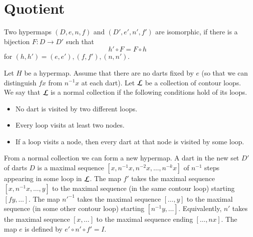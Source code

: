 %
%
%
%




\section{Quotient}


\begin{definition}[isomorphic] Two hypermaps $(D,e,n,f)$ and $(D',e',n',f')$ are
isomorphic, if there is a bijection $F:D\to D'$ such that
    $$h'\circ F = F\circ h$$
for $(h,h')=(e,e'), (f,f'), (n,n')$.
\end{definition}


\begin{definition}
Let $H$ be a hypermap. Assume that 
there are no darts fixed by $e$ 
(so that we can distinguish $f x$
from $n^{-1} x$ at each dart). 
Let $\cal L$ be a collection of contour
loops.  We say that $\cal L$ is a normal collection if the following
conditions hold of its loops. \begin{itemize}
 \item No dart is visited by two different loops.
 \item Every loop visits at least two nodes.
 \item If a loop visits a node, then every dart at that node is
 visited by some loop.
\end{itemize}
\end{definition}

From a normal collection we can form a new hypermap.   A dart in the
new set $D'$ of darts
$D$ is a maximal sequence $[x,n^{-1} x, n^{-2} x,\ldots,n^{-k} x]$
    of $n^{-1}$ steps appearing in some loop in $\cal L$.
The map $f'$ takes the maximal sequence
    $[x,n^{-1}x,\ldots,y]$ to the maximal
   sequence (in the same contour loop) starting 
    $[f y,\ldots]$.
The map ${n'}^{-1}$ takes the maximal sequence
    $[\ldots,y]$ to the maximal sequence (in some other contour loop)
starting $[n^{-1}y,\ldots]$. Equivalently, 
$n'$ takes the maximal sequence
$[x,\ldots]$ to the maximal sequence ending $[\ldots,n x]$. The map $e$ is
defined by $e'\circ n'\circ f' = I$.  

